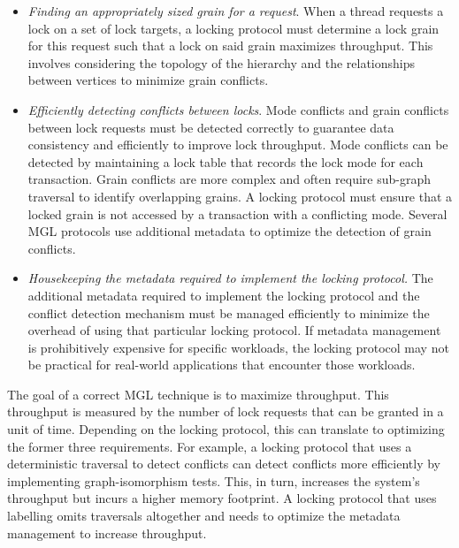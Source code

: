 \begin{itemize}

    \item[\Rb] \emph{Finding an appropriately sized grain for a request}. When a thread requests a lock on a set of lock targets, a locking protocol must determine a lock grain for this request such that a lock on said grain maximizes throughput. This involves considering the topology of the hierarchy and the relationships between vertices to minimize grain conflicts.
    
    \item[\Rc] \emph{Efficiently detecting conflicts between locks}. Mode conflicts and grain conflicts between lock requests must be detected correctly to guarantee data consistency and efficiently to improve lock throughput. Mode conflicts can be detected by maintaining a lock table that records the lock mode for each transaction. Grain conflicts are more complex and often require sub-graph traversal to identify overlapping grains. A locking protocol must ensure that a locked grain is not accessed by a transaction with a conflicting mode. Several MGL protocols use additional metadata to optimize the detection of grain conflicts.

    \item[\Rd] \emph{Housekeeping the metadata required to implement the locking protocol.} The additional metadata required to implement the locking protocol and the conflict detection mechanism must be managed efficiently to minimize the overhead of using that particular locking protocol. If metadata management is prohibitively expensive for specific workloads, the locking protocol may not be practical for real-world applications that encounter those workloads. 

\end{itemize}


The goal of a correct MGL technique is to maximize throughput. This throughput is measured by the number of lock requests that can be granted in a unit of time. Depending on the locking protocol, this can translate to optimizing the former three requirements. For example, a locking protocol that uses a deterministic traversal to detect conflicts can detect conflicts more efficiently by implementing graph-isomorphism tests. This, in turn, increases the system's throughput but incurs a higher memory footprint. A locking protocol that uses labelling omits traversals altogether and needs to optimize the metadata management to increase throughput. 


